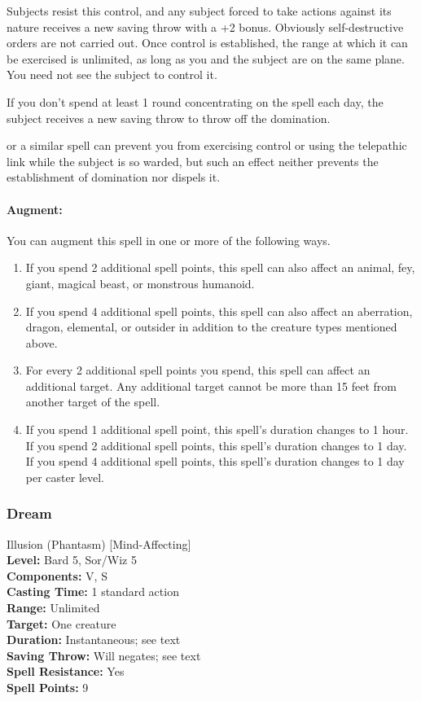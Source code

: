 Subjects resist this control, and any subject forced to take actions against its nature receives a new saving throw with a +2 bonus. 
Obviously self-destructive orders are not carried out. 
Once control is established, the range at which it can be exercised is unlimited, as long as you and the subject are on the same plane. 
You need not see the subject to control it.

If you don't spend at least 1 round concentrating on the spell each day, the subject receives a new saving throw to throw off the domination.

 or a similar spell can prevent you from exercising control or using the telepathic link while the subject is so warded, 
but such an effect neither prevents the establishment of domination nor dispels it.

\paragraph{Augment:} You can augment this spell in one or more of the following ways.
\begin{enumerate}
 \item If you spend 2 additional spell points, this spell can also affect an animal, fey, giant, magical beast, or monstrous humanoid.
 \item If you spend 4 additional spell points, this spell can also affect an aberration, 
 dragon, elemental, or outsider in addition to the creature types mentioned above.
 \item For every 2 additional spell points you spend, this spell can affect an additional target. 
 Any additional target cannot be more than 15 feet from another target of the spell.
 \item If you spend 1 additional spell point, this spell's duration changes to 1 hour.
 If you spend 2 additional spell points, this spell's duration changes to 1 day. 
 If you spend 4 additional spell points, this spell's duration changes to 1 day per caster level.
\end{enumerate}
\subsubsection{Dream}
\label{Spell:Dream}
Illusion (Phantasm) [Mind-Affecting]
\\ \textbf{Level:} Bard 5, Sor/Wiz 5
\\ \textbf{Components:} V, S
\\ \textbf{Casting Time:} 1 standard action
\\ \textbf{Range:} Unlimited
\\ \textbf{Target:} One creature
\\ \textbf{Duration:} Instantaneous; see text
\\ \textbf{Saving Throw:} Will negates; see text
\\ \textbf{Spell Resistance:} Yes
\\ \textbf{Spell Points:} 9

